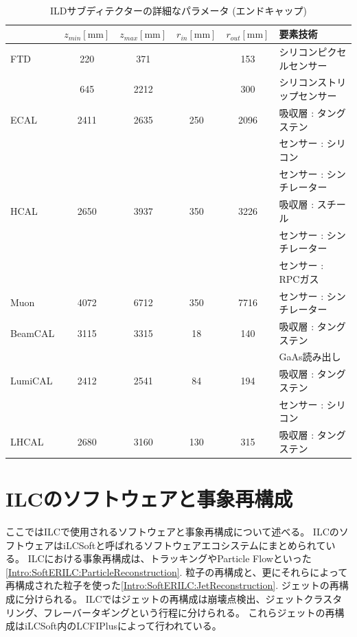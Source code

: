 \begin{table}[htb]
 \centering
　\small
  \begin{tabular}{l c c c c l} \hline
     & $z_{min} \mathrm{[mm]}$ & $z_{max} \mathrm{[mm]}$ & $r_{in} \mathrm{[mm]}$ & $r_{out} \mathrm{[mm]}$ & 要素技術\\ \hline \hline
    FTD & 220 & 371 & & 153 & シリコンピクセルセンサー\\
            & 645 & 2212 & & 300 & シリコンストリップセンサー\\ \hline
    ECAL & 2411 & 2635 & 250 & 2096 & 吸収層 : タングステン\\
    &&&&& センサー : シリコン\\
    &&&&& センサー : シンチレーター\\
    HCAL & 2650 & 3937 & 350 & 3226 & 吸収層 : スチール\\
    &&&&& センサー : シンチレーター\\
    &&&&& センサー : RPCガス\\
    Muon & 4072 & 6712 & 350 & 7716 & センサー : シンチレーター\\ \hline
    BeamCAL & 3115 & 3315 & 18 & 140 & 吸収層 : タングステン\\
    &&&&& GaAs読み出し \\
    LumiCAL & 2412 & 2541 & 84 & 194 & 吸収層 : タングステン\\
    &&&&& センサー : シリコン\\
    LHCAL & 2680 & 3160 & 130 & 315 &吸収層 : タングステン\\ \hline
  \end{tabular}
  \caption{ILDサブディテクターの詳細なパラメータ (エンドキャップ) \cite{InterimDesignReport}}
  \label{ILDSubdetectorParametersEndCap}
\end{table}

\section{ILCのソフトウェアと事象再構成} \label{Intro:SoftwareandEventReconstructionofILC}

ここではILCで使用されるソフトウェアと事象再構成について述べる。
ILCのソフトウェアはiLCSoft\cite{iLCSoft}と呼ばれるソフトウェアエコシステムにまとめられている。
ILCにおける事象再構成は、トラッキングやParticle Flowといった\ref{Intro:SoftERILC:ParticleReconstruction}. 粒子の再構成と、更にそれらによって再構成された粒子を使った\ref{Intro:SoftERILC:JetReconstruction}. ジェットの再構成に分けられる。
ILCではジェットの再構成は崩壊点検出、ジェットクラスタリング、フレーバータギングという行程に分けられる。
これらジェットの再構成はiLCSoft内のLCFIPlus\cite{LCFIPlus}によって行われている。

